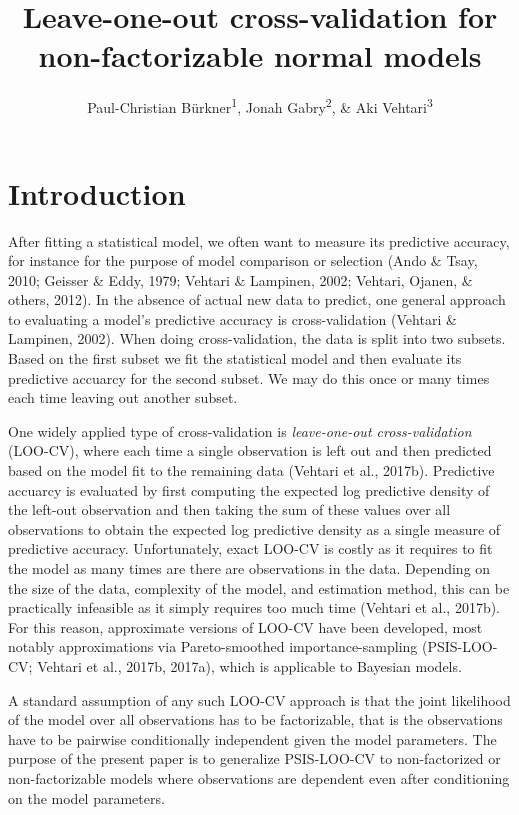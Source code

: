 \documentclass[english,,doc,floatsintext]{apa6}
\title{Leave-one-out cross-validation for non-factorizable normal models}
\author{Paul-Christian Bürkner\textsuperscript{1}, Jonah
Gabry\textsuperscript{2}, \& Aki Vehtari\textsuperscript{3}}
\date{}
\affiliation{
\vspace{0.5cm}
\textsuperscript{1} Department of Psychology, University of Münster, Germany\\\textsuperscript{2} Institute for Social and Economic Research in Policy, Columbia University, USA\\\textsuperscript{3} Department of Computer Science, Aalto University, Finland}
\theoremstyle{definition}
\theoremstyle{definition}
\theoremstyle{definition}
\theoremstyle{remark}
\begin{document}
\maketitle

\hypertarget{introduction}{%
\section{Introduction}\label{introduction}}

After fitting a statistical model, we often want to measure its
predictive accuracy, for instance for the purpose of model comparison or
selection (Ando \& Tsay, 2010; Geisser \& Eddy, 1979; Vehtari \&
Lampinen, 2002; Vehtari, Ojanen, \& others, 2012). In the absence of
actual new data to predict, one general approach to evaluating a model's
predictive accuracy is cross-validation (Vehtari \& Lampinen, 2002).
When doing cross-validation, the data is split into two subsets. Based
on the first subset we fit the statistical model and then evaluate its
predictive accuarcy for the second subset. We may do this once or many
times each time leaving out another subset.

One widely applied type of cross-validation is \emph{leave-one-out
cross-validation} (LOO-CV), where each time a single observation is left
out and then predicted based on the model fit to the remaining data
(Vehtari et al., 2017b). Predictive accuarcy is evaluated by first
computing the expected log predictive density of the left-out
observation and then taking the sum of these values over all
observations to obtain the expected log predictive density as a single
measure of predictive accuracy. Unfortunately, exact LOO-CV is costly as
it requires to fit the model as many times are there are observations in
the data. Depending on the size of the data, complexity of the model,
and estimation method, this can be practically infeasible as it simply
requires too much time (Vehtari et al., 2017b). For this reason,
approximate versions of LOO-CV have been developed, most notably
approximations via Pareto-smoothed importance-sampling (PSIS-LOO-CV;
Vehtari et al., 2017b, 2017a), which is applicable to Bayesian models.

A standard assumption of any such LOO-CV approach is that the joint
likelihood of the model over all observations has to be factorizable,
that is the observations have to be pairwise conditionally independent
given the model parameters. The purpose of the present paper is to
generalize PSIS-LOO-CV to non-factorized or non-factorizable models
where observations are dependent even after conditioning on the model
parameters.
\end{document}
